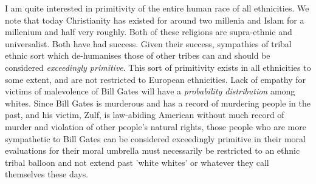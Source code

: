 \documentclass{amsart}
\begin{document}
I am quite interested in primitivity of the entire human race of all ethnicities.  We note that today Christianity has existed for around two millenia and Islam for a millenium and half very roughly.  Both of these religions are supra-ethnic and universalist.  Both have had success.  Given their success, sympathies of tribal ethnic sort which de-humanises those of other tribes can and should be considered {\em exceedingly primitive}.  This sort of primitivity exists in all ethnicities to some extent, and are not restricted to European ethnicities.  Lack of empathy for victims of malevolence of Bill Gates will have a {\em probability distribution} among whites.  Since Bill Gates is murderous and has a record of murdering people in the past, and his victim, Zulf, is law-abiding American without much record of murder and violation of other people's natural rights, those people who are more sympathetic to Bill Gates can be considered exceedingly primitive in their moral evaluations for their moral umbrella must necessarily be restricted to an ethnic tribal balloon and not extend past 'white whites' or whatever they call themselves these days.
\end{document}
